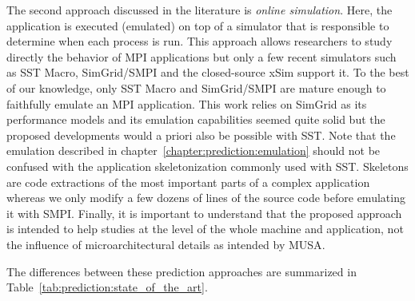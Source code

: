         The second approach discussed in the literature is \emph{online simulation}.  Here, the application is executed
        (emulated) on top of a simulator that is responsible to determine when each process is run. This approach allows
        researchers to study directly the behavior of MPI applications but only a few recent simulators such as SST
        Macro\cite{sstmacro}, SimGrid/SMPI\cite{simgrid} and the closed-source xSim\cite{xsim} support it. To the best
        of our knowledge, only SST Macro and SimGrid/SMPI are mature enough to faithfully emulate an MPI application.
        This work relies on SimGrid as its performance models and its emulation capabilities seemed quite solid but the
        proposed developments would a priori also be possible with SST.  Note that the emulation described in
        chapter~\ref{chapter:prediction:emulation} should not be confused with the application
        skeletonization\cite{sst_skeleton} commonly used with SST. Skeletons are code extractions of the most important
        parts of a complex application whereas we only modify a few dozens of lines of the source code before emulating
        it with SMPI. Finally, it is important to understand that the proposed approach is intended to help studies at
        the level of the whole machine and application, not the influence of microarchitectural details as intended by
        MUSA\cite{musa_16}.

        The differences between these prediction approaches are summarized in
        Table~\ref{tab:prediction:state_of_the_art}.


